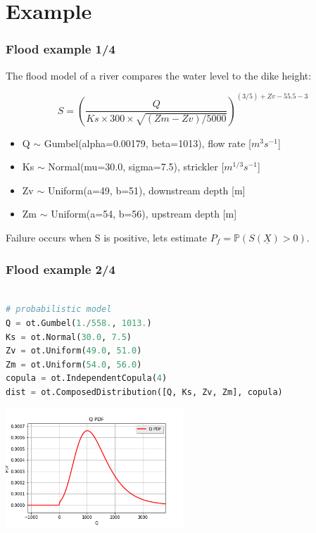 \documentclass{beamer}
\begin{document}

\section{Example}

\begin{frame}[containsverbatim]
\frametitle{Flood example 1/4}

The flood model of a river compares the water level to the dike height:

$$S = \left(\frac{Q}{Ks\times300\times\sqrt{(Zm-Zv)/5000}}\right)^{(3/5) +Zv-55.5-3}$$

\begin{itemize}
\item Q $\sim$ Gumbel(alpha=0.00179, beta=1013), flow rate [$m^3s^{-1}$]
\item Ks $\sim$ Normal(mu=30.0, sigma=7.5), strickler [$m^{1/3}s^{-1}$]
\item Zv $\sim$ Uniform(a=49, b=51), downstream depth [m]
\item Zm $\sim$ Uniform(a=54, b=56), upstream depth [m]
\end{itemize}

Failure occurs when S is positive, lets estimate $P_f ={\mathbb P}\left( S(\underline{X}) > 0 \right)$.


\end{frame}

\begin{frame}[containsverbatim]
\frametitle{Flood example 2/4}
\begin{adjustbox}{max width=\linewidth, margin=0pt}
\begin{lstlisting}[language=Python,basicstyle=\ttfamily,keywordstyle=\color{red}]

# probabilistic model
Q = ot.Gumbel(1./558., 1013.)
Ks = ot.Normal(30.0, 7.5)
Zv = ot.Uniform(49.0, 51.0)
Zm = ot.Uniform(54.0, 56.0)
copula = ot.IndependentCopula(4)
dist = ot.ComposedDistribution([Q, Ks, Zv, Zm], copula)
\end{lstlisting}
\end{adjustbox}

\begin{center}
\includegraphics[width=0.5\textwidth]{figures/q_dist}
\end{center}

\end{frame}
\end{document}
